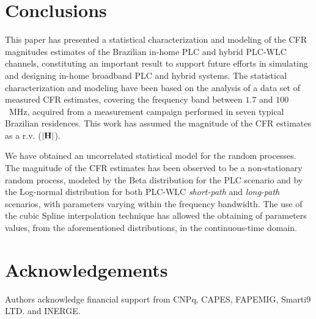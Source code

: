 \documentclass[journal]{IEEEtran}
\begin{document}
\section{Conclusions}
This paper has presented a statistical characterization and modeling of the \ac{CFR} magnitudes estimates of the Brazilian in-home \ac{PLC} and hybrid \ac{PLC}-\ac{WLC} channels, constituting an important result to support future efforts in simulating and designing in-home broadband \ac{PLC} and hybrid systems. The statistical characterization and modeling have been based on the analysis of a data set of measured \ac{CFR} estimates, covering the frequency band between $1.7$ and $100$~MHz, acquired from a measurement campaign performed in seven typical Brazilian residences. This work has assumed the magnitude of the \ac{CFR} estimates as a \ac{r.v.} ($|{\bf H}|$).
 
We have obtained an uncorrelated statistical model for the random processes. The magnitude of the \ac{CFR} estimates has been observed to be a non-stationary random process, modeled by the Beta distribution for the \ac{PLC} scenario and by the Log-normal distribution for both \ac{PLC}-\ac{WLC} \textit{short-path} and \textit{long-path} scenarios, with parameters varying within the frequency  bandwidth. The use of the cubic Spline interpolation technique has allowed the obtaining of parameters values, from the aforementioned distributions, in the continuous-time domain.

\section*{Acknowledgements}
Authors acknowledge financial support from CNPq, CAPES, FAPEMIG, Smarti9 LTD. and INERGE.




\end{document}
